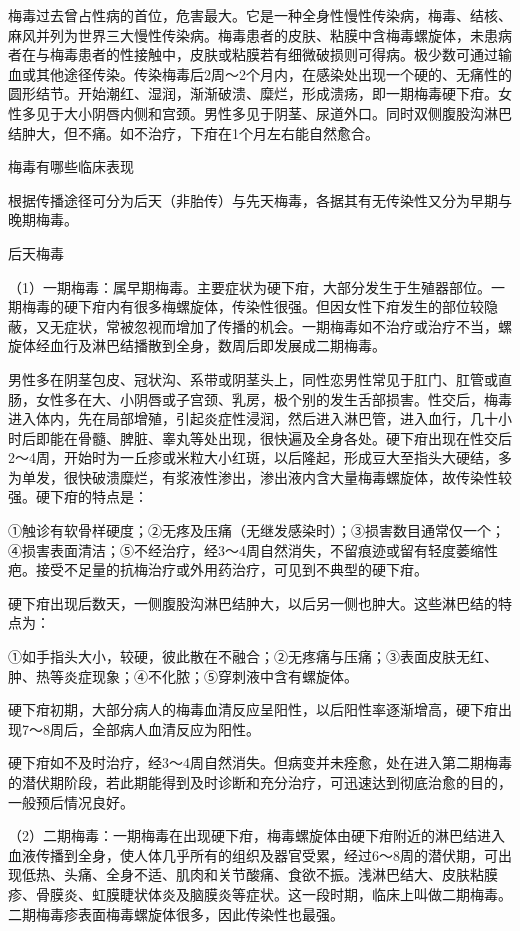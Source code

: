 \documentclass[12pt,UTF8]{ctexbook}
\begin{document}
梅毒过去曾占性病的首位，危害最大。它是一种全身性慢性传染病，梅毒、结核、麻风并列为世界三大慢性传染病。梅毒患者的皮肤、粘膜中含梅毒螺旋体，未患病者在与梅毒患者的性接触中，皮肤或粘膜若有细微破损则可得病。极少数可通过输血或其他途径传染。传染梅毒后2周～2个月内，在感染处出现一个硬的、无痛性的圆形结节。开始潮红、湿润，渐渐破溃、糜烂，形成溃疡，即一期梅毒硬下疳。女性多见于大小阴唇内侧和宫颈。男性多见于阴茎、尿道外口。同时双侧腹股沟淋巴结肿大，但不痛。如不治疗，下疳在1个月左右能自然愈合。





梅毒有哪些临床表现


根据传播途径可分为后天（非胎传）与先天梅毒，各据其有无传染性又分为早期与晚期梅毒。

后天梅毒

（1）一期梅毒：属早期梅毒。主要症状为硬下疳，大部分发生于生殖器部位。一期梅毒的硬下疳内有很多梅螺旋体，传染性很强。但因女性下疳发生的部位较隐蔽，又无症状，常被忽视而增加了传播的机会。一期梅毒如不治疗或治疗不当，螺旋体经血行及淋巴结播散到全身，数周后即发展成二期梅毒。

男性多在阴茎包皮、冠状沟、系带或阴茎头上，同性恋男性常见于肛门、肛管或直肠，女性多在大、小阴唇或子宫颈、乳房，极个别的发生舌部损害。性交后，梅毒进入体内，先在局部增殖，引起炎症性浸润，然后进入淋巴管，进入血行，几十小时后即能在骨髓、脾脏、睾丸等处出现，很快遍及全身各处。硬下疳出现在性交后2～4周，开始时为一丘疹或米粒大小红斑，以后隆起，形成豆大至指头大硬结，多为单发，很快破溃糜烂，有浆液性渗出，渗出液内含大量梅毒螺旋体，故传染性较强。硬下疳的特点是：

①触诊有软骨样硬度；②无疼及压痛（无继发感染时）；③损害数目通常仅一个；④损害表面清洁；⑤不经治疗，经3～4周自然消失，不留痕迹或留有轻度萎缩性疤。接受不足量的抗梅治疗或外用药治疗，可见到不典型的硬下疳。

硬下疳出现后数天，一侧腹股沟淋巴结肿大，以后另一侧也肿大。这些淋巴结的特点为：

①如手指头大小，较硬，彼此散在不融合；②无疼痛与压痛；③表面皮肤无红、肿、热等炎症现象；④不化脓；⑤穿刺液中含有螺旋体。

硬下疳初期，大部分病人的梅毒血清反应呈阳性，以后阳性率逐渐增高，硬下疳出现7～8周后，全部病人血清反应为阳性。

硬下疳如不及时治疗，经3～4周自然消失。但病变并未痊愈，处在进入第二期梅毒的潜伏期阶段，若此期能得到及时诊断和充分治疗，可迅速达到彻底治愈的目的，一般预后情况良好。

（2）二期梅毒：一期梅毒在出现硬下疳，梅毒螺旋体由硬下疳附近的淋巴结进入血液传播到全身，使人体几乎所有的组织及器官受累，经过6～8周的潜伏期，可出现低热、头痛、全身不适、肌肉和关节酸痛、食欲不振。浅淋巴结大、皮肤粘膜疹、骨膜炎、虹膜睫状体炎及脑膜炎等症状。这一段时期，临床上叫做二期梅毒。二期梅毒疹表面梅毒螺旋体很多，因此传染性也最强。
\end{document}
